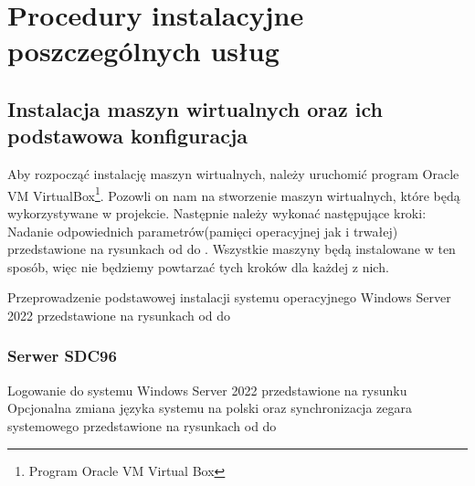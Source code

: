 	\newpage
\section{Procedury instalacyjne poszczególnych usług}		%


\subsection{Instalacja maszyn wirtualnych oraz ich podstawowa konfiguracja}	

Aby rozpocząć instalację maszyn wirtualnych, należy uruchomić program Oracle VM VirtualBox\footnote{Program Oracle VM Virtual Box\cite{VirtualBox}}. Pozowli on nam na stworzenie maszyn wirtualnych, które będą wykorzystywane w projekcie. Następnie należy wykonać następujące kroki:\\

Nadanie odpowiednich parametrów(pamięci operacyjnej jak i trwałej) przedstawione na rysunkach od  do . Wszystkie maszyny będą instalowane w ten sposób, więc nie będziemy powtarzać tych kroków dla każdej z nich.
\clearpage

\clearpage

\clearpage

Przeprowadzenie podstawowej instalacji systemu operacyjnego Windows Server 2022 przedstawione na rysunkach od  do 

\clearpage

\clearpage

\clearpage

\clearpage
\subsubsection{Serwer SDC96}
Logowanie do systemu Windows Server 2022 przedstawione na rysunku 
\clearpage
Opcjonalna zmiana języka systemu na polski oraz synchronizacja zegara systemowego przedstawione na rysunkach od  do 
\clearpage

